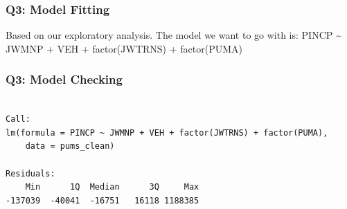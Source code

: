 \documentclass[
  letterpaper,
  DIV=11,
  numbers=noendperiod]{scrartcl}
\begin{document}
\subsubsection{Q3: Model Fitting}\label{q3-model-fitting}

Based on our exploratory analysis. The model we want to go with is:
PINCP \textasciitilde{} JWMNP + VEH + factor(JWTRNS) + factor(PUMA)

\subsubsection{Q3: Model Checking}\label{q3-model-checking}

\begin{verbatim}

Call:
lm(formula = PINCP ~ JWMNP + VEH + factor(JWTRNS) + factor(PUMA), 
    data = pums_clean)

Residuals:
    Min      1Q  Median      3Q     Max 
-137039  -40041  -16751   16118 1188385 


\end{verbatim}
\end{document}
